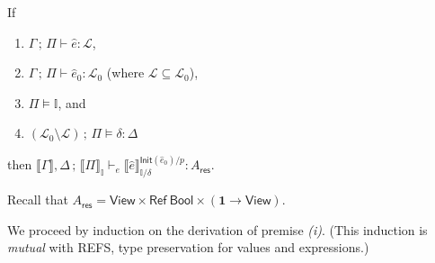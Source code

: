 \documentclass{article}
\newcommand{\mf}[1]{\mathsf{#1}}
\newcommand{\mc}[1]{\mathcal{#1}}
\newcommand{\mb}[1]{\mathbf{#1}}
\newcommand{\semi}{\,;\,}
\newcommand{\hl}[1]{\colorbox{LightGoldenrod1}{#1}}
\newcommand{\llrr}[1]{\llbracket #1 \rrbracket}
\newcommand{\tone}{\mb{1}}
\newcommand{\tbool}{\mf{Bool}}
\newcommand{\tview}{\mf{View}}
\newcommand{\tref}[1]{\mf{Ref}\ #1}
\newcommand{\Ell}{\mc{L}}
\newcommand{\I}{\mathbb{I}}
\begin{document}
\begin{lemma}
\label{thm:tprezbodi}
If \begin{enumerate}[label=(\roman*)]
\item $\Gamma \semi \Pi \vdash \hat{e}: \Ell$,
\item $\Gamma \semi \Pi \vdash \hat{e}_0: \Ell_0$
(where $\Ell \subseteq \Ell_0$),
\item $\Pi \vDash \I$, and
\item $(\Ell_0 \setminus \Ell) \semi \Pi \vDash \delta: \Delta$
\end{enumerate}
then $\llrr{\Gamma}, \Delta \semi \llrr{\Pi}_\I
\vdash_e
\llrr{\hat{e}}^{\mf{Init}(\hat{e}_0)/p}_{\I/\delta}: A_\mf{res}$.

\begin{Proof}
Recall that $A_\mf{res}=\tview \times 
\tref{\tbool} \times (\tone \rightarrow \tview)$.

We proceed by induction on the derivation of premise \emph{(i)}.
(This induction is \emph{mutual} 
with \hl{REFS}, type preservation for values and expressions.)


\end{Proof}
\end{lemma}
\end{document}
